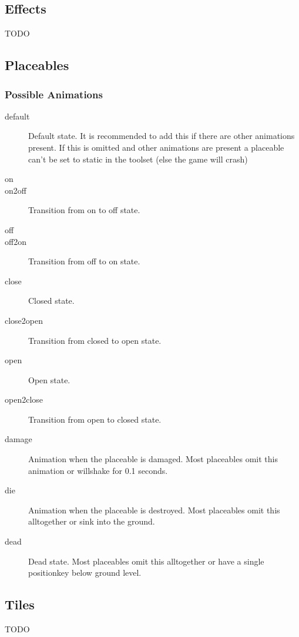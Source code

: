 \subsection{Effects}
TODO


\subsection{Placeables}

\subsubsection*{Possible Animations}
\begin{description}
    \item[default] Default state. It is recommended to add this if there are other animations present. If this is omitted and other animations are present a placeable can't be set to static in the toolset (else the game will crash)
    \item[on]
    \item[on2off] Transition from on to off state.
    \item[off]
    \item[off2on] Transition from off to on state.
    \item[close] Closed state.
    \item[close2open] Transition from closed to open state.
    \item[open] Open state.
    \item[open2close] Transition from open to closed state.
    \item[damage] Animation when the placeable is damaged. Most placeables omit this animation or willshake for 0.1 seconds.
    \item[die] Animation when the placeable is destroyed. Most placeables omit this alltogether or sink into the ground.
    \item[dead] Dead state. Most placeables omit this alltogether or have a single positionkey below ground level.
\end{description}

\subsection{Tiles}
TODO
